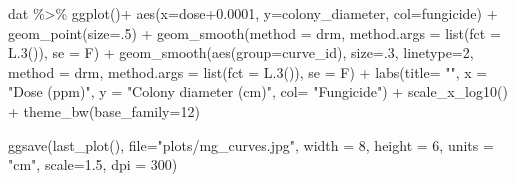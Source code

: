 \documentclass[
  letterpaper,
  DIV=11,
  numbers=noendperiod]{scrreport}
\newenvironment{Shaded}{\begin{snugshade}}{\end{snugshade}}
\newcommand{\AttributeTok}[1]{\textcolor[rgb]{0.40,0.45,0.13}{#1}}
\newcommand{\DecValTok}[1]{\textcolor[rgb]{0.68,0.00,0.00}{#1}}
\newcommand{\FloatTok}[1]{\textcolor[rgb]{0.68,0.00,0.00}{#1}}
\newcommand{\FunctionTok}[1]{\textcolor[rgb]{0.28,0.35,0.67}{#1}}
\newcommand{\NormalTok}[1]{\textcolor[rgb]{0.00,0.23,0.31}{#1}}
\newcommand{\SpecialCharTok}[1]{\textcolor[rgb]{0.37,0.37,0.37}{#1}}
\newcommand{\StringTok}[1]{\textcolor[rgb]{0.13,0.47,0.30}{#1}}
\begin{document}
\begin{Shaded}
\begin{Highlighting}[]
\NormalTok{dat }\SpecialCharTok{\%\textgreater{}\%} 
  \FunctionTok{ggplot}\NormalTok{()}\SpecialCharTok{+}
  \FunctionTok{aes}\NormalTok{(}\AttributeTok{x=}\NormalTok{dose}\FloatTok{+0.0001}\NormalTok{, }\AttributeTok{y=}\NormalTok{colony\_diameter, }\AttributeTok{col=}\NormalTok{fungicide) }\SpecialCharTok{+}
  \FunctionTok{geom\_point}\NormalTok{(}\AttributeTok{size=}\NormalTok{.}\DecValTok{5}\NormalTok{) }\SpecialCharTok{+} 
  \FunctionTok{geom\_smooth}\NormalTok{(}\AttributeTok{method =}\NormalTok{ drm, }
              \AttributeTok{method.args =} \FunctionTok{list}\NormalTok{(}\AttributeTok{fct =} \FunctionTok{L.3}\NormalTok{()), }\AttributeTok{se =}\NormalTok{ F) }\SpecialCharTok{+}
    \FunctionTok{geom\_smooth}\NormalTok{(}\FunctionTok{aes}\NormalTok{(}\AttributeTok{group=}\NormalTok{curve\_id), }\AttributeTok{size=}\NormalTok{.}\DecValTok{3}\NormalTok{, }\AttributeTok{linetype=}\DecValTok{2}\NormalTok{,  }
              \AttributeTok{method =}\NormalTok{ drm, }
              \AttributeTok{method.args =} \FunctionTok{list}\NormalTok{(}\AttributeTok{fct =} \FunctionTok{L.3}\NormalTok{()), }\AttributeTok{se =}\NormalTok{ F) }\SpecialCharTok{+}
  \FunctionTok{labs}\NormalTok{(}\AttributeTok{title=} \StringTok{""}\NormalTok{, }\AttributeTok{x =} \StringTok{"Dose (ppm)"}\NormalTok{,  }\AttributeTok{y =} \StringTok{"Colony diameter (cm)"}\NormalTok{, }\AttributeTok{col=} \StringTok{"Fungicide"}\NormalTok{) }\SpecialCharTok{+} 
  \FunctionTok{scale\_x\_log10}\NormalTok{() }\SpecialCharTok{+}
  \FunctionTok{theme\_bw}\NormalTok{(}\AttributeTok{base\_family=}\DecValTok{12}\NormalTok{)}
\end{Highlighting}
\end{Shaded}

\begin{Shaded}
\begin{Highlighting}[]
\FunctionTok{ggsave}\NormalTok{(}\FunctionTok{last\_plot}\NormalTok{(), }\AttributeTok{file=}\StringTok{"plots/mg\_curves.jpg"}\NormalTok{, }\AttributeTok{width =} \DecValTok{8}\NormalTok{, }\AttributeTok{height =} \DecValTok{6}\NormalTok{, }\AttributeTok{units =} \StringTok{"cm"}\NormalTok{, }\AttributeTok{scale=}\FloatTok{1.5}\NormalTok{, }\AttributeTok{dpi =} \DecValTok{300}\NormalTok{)}
\end{Highlighting}
\end{Shaded}
\end{document}
